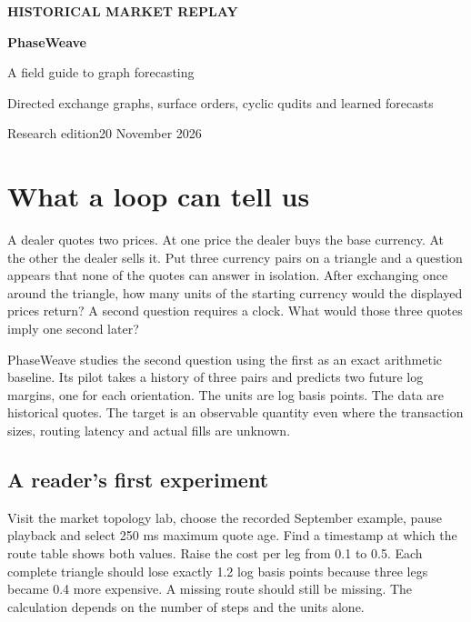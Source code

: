 \documentclass[11pt,oneside,openany]{book}
\begin{document}
\hypersetup{pageanchor=false}\begin{titlepage}
\color{ink}\vspace*{.40in}
{\sffamily\bfseries\color{teal} HISTORICAL MARKET REPLAY}\par\vspace{.35in}
{\sffamily\bfseries\fontsize{43}{45}\selectfont PhaseWeave}\par\vspace{.12in}
{\fontsize{22}{26}\selectfont A field guide to graph forecasting}\par
\vspace{.37in}{\color{gold}\rule{.7\linewidth}{1.6pt}}\par\vspace{.27in}
Directed exchange graphs, surface orders, cyclic qudits and learned forecasts\par
\vfill
{\sffamily Research edition\hfill 20 November 2026}\par
\end{titlepage}
\hypersetup{pageanchor=true}\tableofcontents

\chapter{What a loop can tell us}
A dealer quotes two prices. At one price the dealer buys the base currency. At the other the dealer sells it. Put three currency pairs on a triangle and a question appears that none of the quotes can answer in isolation. After exchanging once around the triangle, how many units of the starting currency would the displayed prices return? A second question requires a clock. What would those three quotes imply one second later?

PhaseWeave studies the second question using the first as an exact arithmetic baseline. Its pilot takes a history of three pairs and predicts two future log margins, one for each orientation. The units are log basis points. The data are historical quotes. The target is an observable quantity even where the transaction sizes, routing latency and actual fills are unknown.

\section*{A reader's first experiment}
Visit the market topology lab, choose the recorded September example, pause playback and select 250 ms maximum quote age. Find a timestamp at which the route table shows both values. Raise the cost per leg from 0.1 to 0.5. Each complete triangle should lose exactly 1.2 log basis points because three legs became 0.4 more expensive. A missing route should still be missing. The calculation depends on the number of steps and the units alone.
\end{document}
